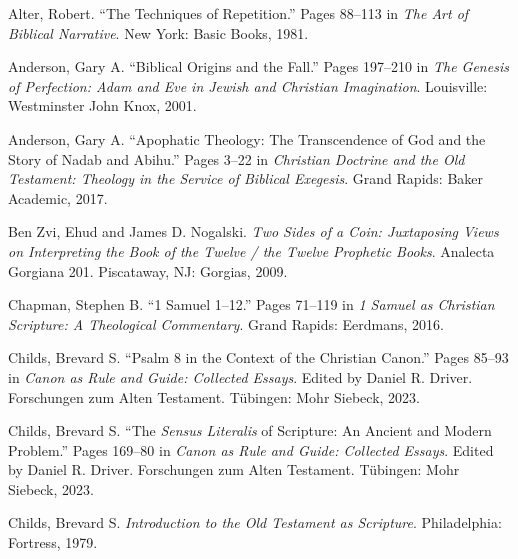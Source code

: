 \documentclass[titlepage]{article}
\begin{document}
\begingroup
\renewcommand{\section}[2]{}%
\begin{thebibliography}{99}
\makeatletter%
\addtocounter{\@listctr}{14}
\makeatother

 Alter, Robert. “The Techniques of Repetition.” Pages 88–113 in \emph{The Art of Biblical Narrative}. New York: Basic Books, 1981.

 Anderson, Gary A. “Biblical Origins and the Fall.” Pages 197–210 in \emph{The Genesis of Perfection: Adam and Eve in Jewish and Christian Imagination}. Louisville: Westminster John Knox, 2001.

 Anderson, Gary A. “Apophatic Theology: The Transcendence of God and the Story of Nadab and Abihu.” Pages 3–22 in \emph{Christian Doctrine and the Old Testament: Theology in the Service of Biblical Exegesis}. Grand Rapids: Baker Academic, 2017.

 Ben Zvi, Ehud and James D. Nogalski. \emph{Two Sides of a Coin: Juxtaposing Views on Interpreting the Book of the Twelve / the Twelve Prophetic Books}. Analecta Gorgiana 201. Piscataway, NJ: Gorgias, 2009.

 Chapman, Stephen B. “1 Samuel 1–12.” Pages 71–119 in \emph{1 Samuel as Christian Scripture: A Theological Commentary}. Grand Rapids: Eerdmans, 2016.

 Childs, Brevard S. “Psalm 8 in the Context of the Christian Canon.” Pages 85--93 in \emph{Canon as Rule and Guide: Collected Essays}. Edited by Daniel R. Driver. Forschungen zum Alten Testament. Tübingen: Mohr Siebeck, 2023.

 Childs, Brevard S. “The \emph{Sensus Literalis} of Scripture: An Ancient and Modern Problem.” Pages 169--80 in \emph{Canon as Rule and Guide: Collected Essays}. Edited by Daniel R. Driver. Forschungen zum Alten Testament. Tübingen: Mohr Siebeck, 2023.

 Childs, Brevard S. \emph{Introduction to the Old Testament as Scripture}. Philadelphia: Fortress, 1979.




\end{thebibliography}
\end{document}
